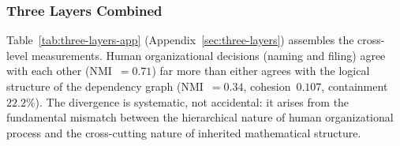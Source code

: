 \subsubsection{Three Layers Combined}
\label{sec:three-layers-main}

Table~\ref{tab:three-layers-app} (Appendix~\ref{sec:three-layers}) assembles the cross-level measurements. Human organizational decisions (naming and filing) agree with each other (NMI~$= 0.71$) far more than either agrees with the logical structure of the dependency graph (NMI~$= 0.34$, cohesion~$0.107$, containment~$22.2\%$). The divergence is systematic, not accidental: it arises from the fundamental mismatch between the hierarchical nature of human organizational process and the cross-cutting nature of inherited mathematical structure.
